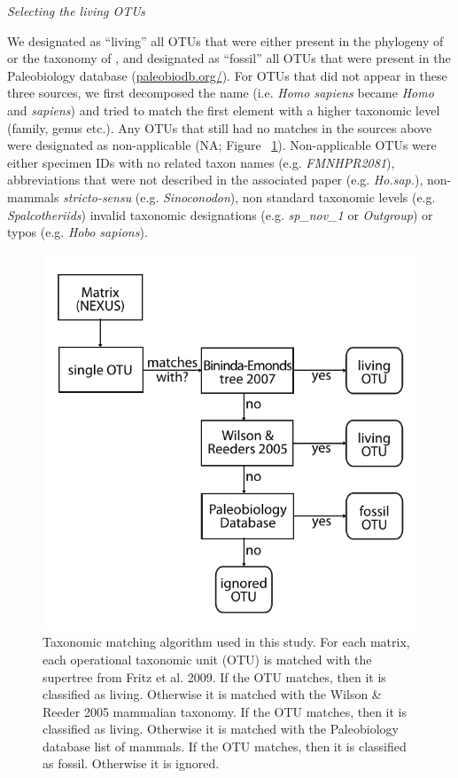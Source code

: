 \documentclass[12pt,letterpaper]{article}
\renewcommand{\subsection}[1]{%
\bigskip
\begin{center}
\begin{large}
\normalfont\itshape #1
\end{large}
\end{center}}
\begin{document}
\subsection{Selecting the living OTUs}
We designated as ``living'' all OTUs that were either present in the phylogeny of \cite{bininda-emondsthe2007} or the taxonomy of \cite{wilson2005mammal}, and designated as ``fossil'' all OTUs that were present in the Paleobiology database (\url{paleobiodb.org/}).
For OTUs that did not appear in these three sources, we first decomposed the name (i.e. \textit{Homo sapiens} became \textit{Homo} and \textit{sapiens}) and tried to match the first element with a higher taxonomic level (family, genus etc.).
Any OTUs that still had no matches in the sources above were designated as non-applicable (NA; Figure ~\ref{Supp_figure_Taxonomic_algorithm}).
Non-applicable OTUs were either specimen IDs with no related taxon names (e.g. \textit{FMNHPR2081}), abbreviations that were not described in the associated paper (e.g. \textit{Ho.sap.}), non-mammals \textit{stricto-sensu} (e.g. \textit{Sinoconodon}), non standard taxonomic levels (e.g. \textit{Spalcotheriids}) invalid taxonomic designations (e.g. \textit{sp\_nov\_1} or \textit{Outgroup}) or typos (e.g. \textit{Hobo sapions}).

\begin{figure}[!htbp]
\centering
    \includegraphics[width=1\textwidth]{Supp_figure_Taxonomic_algorithm.pdf}
\caption{Taxonomic matching algorithm used in this study. For each matrix, each operational taxonomic unit (OTU) is matched with the supertree from Fritz et al. 2009. If the OTU matches, then it is classified as living. Otherwise it is matched with the Wilson \& Reeder 2005 mammalian taxonomy. If the OTU matches, then it is classified as living. Otherwise it is matched with the Paleobiology database list of mammals. If the OTU matches, then it is classified as fossil. Otherwise it is ignored.}
\label{Supp_figure_Taxonomic_algorithm}
\end{figure}
\end{document}
